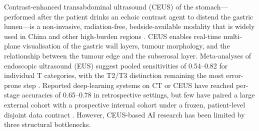 \documentclass[11pt,a4paper]{article}
\begin{document}
Contrast-enhanced transabdominal ultrasound (CEUS) of the stomach---performed after the patient drinks an echoic contrast agent to distend the gastric lumen---is a non-invasive, radiation-free, bedside-available modality that is widely used in China and other high-burden regions \cite{liu2018ceus, zheng2017ceus}. CEUS enables real-time multi-plane visualisation of the gastric wall layers, tumour morphology, and the relationship between the tumour edge and the subserosal layer. Meta-analyses of endoscopic ultrasound (EUS) suggest pooled sensitivities of 0.54--0.82 for individual T categories, with the T2/T3 distinction remaining the most error-prone step \cite{mocellin2011eus, kwee2010euse}. Reported deep-learning systems on CT or CEUS have reached per-stage accuracies of 0.65--0.78 in retrospective settings, but few have paired a large external cohort with a prospective internal cohort under a frozen, patient-level disjoint data contract \cite{liang2023ct, zhang2024ct, zheng2025interpretable, tao2024ct}. However, CEUS-based AI research has been limited by three structural bottlenecks.
\end{document}

